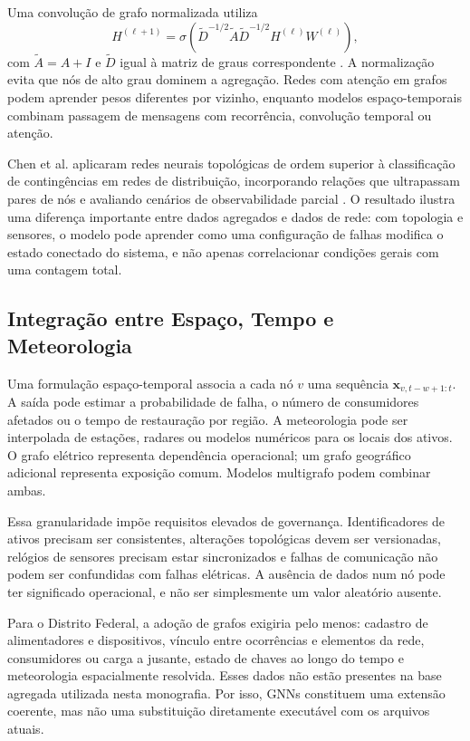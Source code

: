Uma convolução de grafo normalizada utiliza
\begin{equation}
    H^{(\ell+1)}
    =\sigma\!\left(\widetilde{D}^{-1/2}
    \widetilde{A}\widetilde{D}^{-1/2}
    H^{(\ell)}W^{(\ell)}\right),
    \label{eq:gcn}
\end{equation}
com $\widetilde{A}=A+I$ e $\widetilde{D}$ igual à matriz de graus correspondente \cite{kipf2017gcn}. A normalização evita que nós de alto grau dominem a agregação. Redes com atenção em grafos podem aprender pesos diferentes por vizinho, enquanto modelos espaço-temporais combinam passagem de mensagens com recorrência, convolução temporal ou atenção.

Chen et al. aplicaram redes neurais topológicas de ordem superior à classificação de contingências em redes de distribuição, incorporando relações que ultrapassam pares de nós e avaliando cenários de observabilidade parcial \cite{chen2024hotnets}. O resultado ilustra uma diferença importante entre dados agregados e dados de rede: com topologia e sensores, o modelo pode aprender como uma configuração de falhas modifica o estado conectado do sistema, e não apenas correlacionar condições gerais com uma contagem total.

\subsection{Integração entre Espaço, Tempo e Meteorologia}

Uma formulação espaço-temporal associa a cada nó $v$ uma sequência $\mathbf{x}_{v,t-w+1:t}$. A saída pode estimar a probabilidade de falha, o número de consumidores afetados ou o tempo de restauração por região. A meteorologia pode ser interpolada de estações, radares ou modelos numéricos para os locais dos ativos. O grafo elétrico representa dependência operacional; um grafo geográfico adicional representa exposição comum. Modelos multigrafo podem combinar ambas.

Essa granularidade impõe requisitos elevados de governança. Identificadores de ativos precisam ser consistentes, alterações topológicas devem ser versionadas, relógios de sensores precisam estar sincronizados e falhas de comunicação não podem ser confundidas com falhas elétricas. A ausência de dados num nó pode ter significado operacional, e não ser simplesmente um valor aleatório ausente.

Para o Distrito Federal, a adoção de grafos exigiria pelo menos: cadastro de alimentadores e dispositivos, vínculo entre ocorrências e elementos da rede, consumidores ou carga a jusante, estado de chaves ao longo do tempo e meteorologia espacialmente resolvida. Esses dados não estão presentes na base agregada utilizada nesta monografia. Por isso, GNNs constituem uma extensão coerente, mas não uma substituição diretamente executável com os arquivos atuais.

